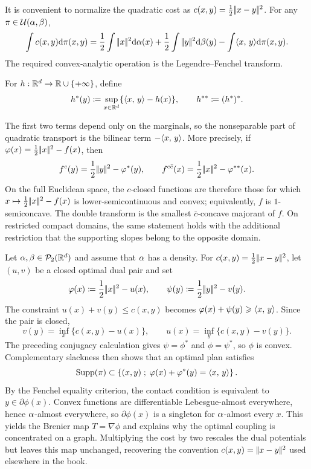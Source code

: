It is convenient to normalize the quadratic cost as
$c(x,y)=\frac12|\!| x-y |\!|^2$. For any $\pi\in\mathcal{U}(\alpha,\beta)$,
\[
	\int c(x,y)\mathrm{d}\pi(x,y)
	=
	\frac12\int|\!| x |\!|^2\mathrm{d}\alpha(x)
	+\frac12\int|\!| y |\!|^2\mathrm{d}\beta(y)
	-\int \langle x,\,y\rangle\mathrm{d}\pi(x,y).
\]
The required convex-analytic operation is the Legendre--Fenchel transform.
\begin{defn}\label{def-legendre-fenchel-transform}
	For $h:\mathbb{R}^d\to\mathbb{R}\cup\{+\infty\}$, define
	\[
		h^*(y)\coloneqq\sup_{x\in\mathbb{R}^d}\{\langle x,\,y\rangle-h(x)\},
		\qquad
		h^{**}\coloneqq(h^*)^*.
	\]
\end{defn}
The first two terms depend only on the marginals, so the nonseparable part of quadratic transport is the bilinear term $-\langle x,\,y\rangle$. More precisely, if
$\varphi(x)=\frac12|\!| x |\!|^2-f(x)$, then
\[
	f^c(y)
	=
	\frac12|\!| y |\!|^2-\varphi^*(y),
	\qquad
	f^{c\bar c}(x)
	=
	\frac12|\!| x |\!|^2-\varphi^{**}(x).
\]
On the full Euclidean space, the $c$-closed functions are therefore those for which
$x\mapsto\frac12|\!| x |\!|^2-f(x)$ is lower-semicontinuous and convex; equivalently, $f$ is $1$-semiconcave. The double transform is the smallest $\bar c$-concave majorant of $f$. On restricted compact domains, the same statement holds with the additional restriction that the supporting slopes belong to the opposite domain.

\begin{rem}\label{rem-proof-brenier}
	Let $\alpha,\beta\in\mathcal{P}_2(\mathbb{R}^d)$ and assume that $\alpha$ has a density. For $c(x,y)=\frac12|\!| x-y |\!|^2$, let $(u,v)$ be a closed optimal dual pair and set
	\[
		\varphi(x)\coloneqq\frac12|\!| x |\!|^2-u(x),
		\qquad
		\psi(y)\coloneqq\frac12|\!| y |\!|^2-v(y).
	\]
	The constraint $u(x)+v(y)\leq c(x,y)$ becomes
	$\varphi(x)+\psi(y)\geqslant\langle x,\,y\rangle$. Since the pair is closed,
	\[
		v(y)=\inf_x\{c(x,y)-u(x)\},
		\qquad
		u(x)=\inf_y\{c(x,y)-v(y)\}.
	\]
	The preceding conjugacy calculation gives $\psi=\phi^*$ and $\phi=\psi^*$, so $\phi$ is convex. Complementary slackness then shows that an optimal plan satisfies
		\[
			\operatorname{Supp}(\pi)
			\subset
			\left\{ (x,y) \;;\; \varphi(x)+\varphi^*(y)=\langle x,\,y\rangle \right\}.
		\]
	By the Fenchel equality criterion, the contact condition is equivalent to $y\in\partial\phi(x)$. Convex functions are differentiable Lebesgue-almost everywhere, hence $\alpha$-almost everywhere, so $\partial\phi(x)$ is a singleton for $\alpha$-almost every $x$. This yields the Brenier map $T=\nabla\phi$ and explains why the optimal coupling is concentrated on a graph. Multiplying the cost by two rescales the dual potentials but leaves this map unchanged, recovering the convention $c(x,y)=|\!| x-y |\!|^2$ used elsewhere in the book.
\end{rem}


